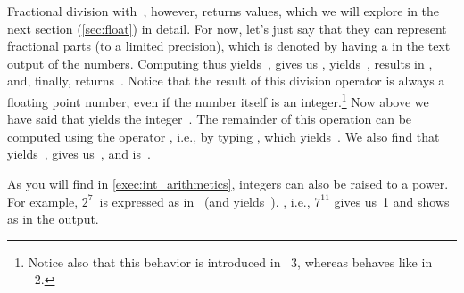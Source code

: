 Fractional division with~\pythonil{/}, however, returns  values, which we will explore in the next section (\cref{sec:float}) in detail.
For now, let's just say that they can represent fractional parts (to a limited precision), which is denoted by having a  in the text output of the numbers.
Computing  thus yields~,  gives us ,  yields~,  results in , and, finally,  returns~.
Notice that the result of this division operator is always a floating point number, even if the number itself is an integer.\footnote{%
Notice also that this behavior is introduced in \python~3, whereas \pythonilIdx{/} behaves like \pythonilIdx{//} in \python~2.}%
%
%
%
Now above we have said that  yields the integer~.
The remainder of this operation can be computed using the  operator \expandafter\pythonilIdx{\%}, i.e., by typing , which yields~.
We also find that \expandafter{} yields~, \expandafter{} gives us~, and \expandafter{} is~.

%

As you will find in \cref{exec:int_arithmetics}, integers can also be raised to a power.
For example, $2^7$~is expressed as  in \python\ (and yields~).
, i.e., $7^{11}$ gives us~1 and shows as  in the output.

